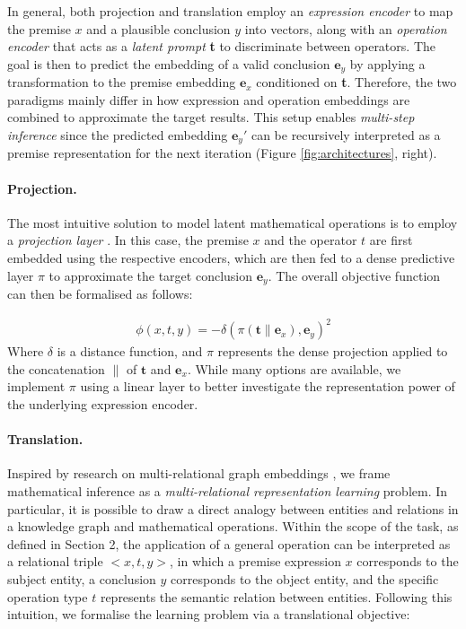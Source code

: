 \documentclass[11pt]{article}
\begin{document}
In general, both projection and translation employ an \emph{expression encoder} to map the premise $x$ and a plausible conclusion $y$ into vectors, along with an \emph{operation encoder} that acts as a \emph{latent prompt} \textbf{t} to discriminate between operators. The goal is then to predict the embedding of a valid conclusion $\textbf{e}_y$ by applying a transformation to the premise embedding $\textbf{e}_x$ conditioned on \textbf{t}. Therefore, the two paradigms mainly differ in how expression and operation embeddings are combined to approximate the target results. This setup enables \emph{multi-step inference} since the predicted embedding $\textbf{e}_y'$ can be recursively interpreted as a premise representation for the next iteration (Figure \ref{fig:architectures}, right). 

\paragraph{Projection.} The most intuitive solution to model latent mathematical operations is to employ a \emph{projection layer} \cite{lee2019mathematical}. In this case, the premise $x$ and the operator $t$ are first embedded using the respective encoders, which are then fed to a dense predictive layer $\pi$ to approximate the target conclusion $\textbf{e}_y$. The overall objective function can then be formalised as follows:

\begin{equation}
    \label{eq:projection}
    \begin{aligned}
        \phi(x,t,y) = -\delta(\pi(\textbf{t}\|\textbf{e}_{x}), \textbf{e}_y)^2
    \end{aligned}
\end{equation}
Where $\delta$ is a distance function, and $\pi$ represents the dense projection applied to the concatenation $\|$ of $\textbf{t}$ and $\textbf{e}_x$. While many options are available, we implement $\pi$ using a linear layer to better investigate the representation power of the underlying expression encoder.

\paragraph{Translation.} Inspired by research on multi-relational graph embeddings \cite{bordes2013translating,balazevic2019multi,valentino2023multi}, we frame mathematical inference as a \emph{multi-relational representation learning} problem. In particular, it is possible to draw a direct analogy between entities and relations in a knowledge graph and mathematical operations. Within the scope of the task, as defined in Section 2, the application of a general operation can be interpreted as a relational triple $< x,t,y >$, in which a premise expression $x$ corresponds to the subject entity, a conclusion $y$ corresponds to the object entity, and the specific operation type $t$ represents the semantic relation between entities.
Following this intuition, we formalise the learning problem via a translational objective:
\end{document}
